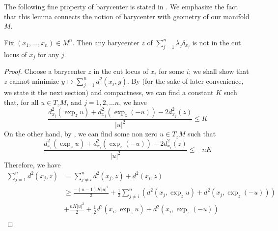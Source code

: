 The following fine property of barycenter is stated in \cite[Lemma 3.1]{kim2015multi}.
We emphasize the fact that this lemma connects the notion of barycenter with geometry of our manifold $M$.
\begin{lem}
	\label{lem:barycenter_out_of_cut_locus}
	Fix \( \left( x _ { 1 } , \ldots , x _ { n } \right) \in M^n\).
	Then any barycenter $z$ of $\sum_{j=1}^n \lambda_j \delta_{x_j}$
	is not in the cut locus of \( x _ { j } \) for any \( j . \)
\end{lem}

\begin{proof}
	Choose a barycenter \( z \) in the cut locus of \( x _ { i } \) for some \( i \);
	we shall show that \( z \) cannot minimize
	\( y \mapsto \sum _ { j = 1 } ^ { n } d ^ { 2 } \left( x _ { j } , y \right) \).
	By  (for the sake of later convenience, we state it the next section) and compactness,
	we can find a constant \( K \) such that, for all \( u \in T _ { z } M \),
	and \( j = 1,2 , \ldots n \), we have
	\[
		\frac { d ^ { 2 }_{x _ { j } } \left(  \exp _ { z } u \right) + d ^ { 2 }_{x _ { j } } \left( \exp _ { z } ( - u ) \right) - 2 d ^ { 2 }_{ x_j} \left( z \right) }
		{ | u | ^ { 2 } } \leq K
	\]
	On the other hand, by ,
	we can find some non
	zero \( u \in T _ { z } M \) such that
	\[
		\frac { d ^ { 2 }_{x _ { i } } \left(  \exp _ { z } u \right) + d ^ { 2 }_{x _ { i } } \left( \exp _ { z } ( - u ) \right) - 2 d ^ { 2 }_{ x_i} \left( z \right) }
		{ | u | ^ { 2 } } \leq - n K
	\]
	Therefore, we have
	\begin{align*}
		\sum _ { j = 1 } ^ { n } d ^ { 2 } \left( x _ { j } , z \right) & = \sum _ { j \neq i } ^ { n } d ^ { 2 } \left( x _ { j } , z \right) + d ^ { 2 } \left( x _ { i } , z \right)                                                                                                                   \\
		                                                                & \geq \frac { - ( n - 1 ) K | u | ^ { 2 } } { 2 } + \frac { 1 } { 2 } \sum _ { j \neq i } ^ { n } \left( d ^ { 2 } \left( x _ { j } , \exp _ { z } u \right) + d ^ { 2 } \left( x _ { j } , \exp _ { z } ( - u ) \right) \right) \\
		                                                                & + \frac { n K | u | ^ { 2 } } { 2 } + \frac { 1 } { 2 } d ^ { 2 } \left( x _ { i } , \exp _ { z } u \right) + d ^ { 2 } \left( x _ { i } , \exp _ { z } ( - u ) \right)                                                         \\

\end{align*}
\end{proof}
